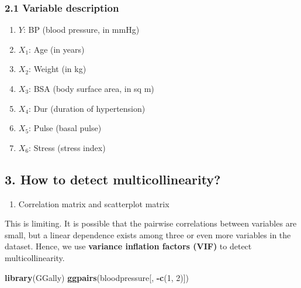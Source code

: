 \documentclass[]{article}
\newenvironment{Shaded}{\begin{snugshade}}{\end{snugshade}}
\newcommand{\DecValTok}[1]{\textcolor[rgb]{0.00,0.00,0.81}{#1}}
\newcommand{\KeywordTok}[1]{\textcolor[rgb]{0.13,0.29,0.53}{\textbf{#1}}}
\newcommand{\NormalTok}[1]{#1}
\newcommand{\OperatorTok}[1]{\textcolor[rgb]{0.81,0.36,0.00}{\textbf{#1}}}
\providecommand{\tightlist}{%
  \setlength{\itemsep}{0pt}\setlength{\parskip}{0pt}}
\begin{document}
\hypertarget{variable-description}{%
\subsubsection{2.1 Variable description}\label{variable-description}}

\begin{enumerate}
\def\labelenumi{\arabic{enumi}.}
\item
  \(Y\): BP (blood pressure, in mmHg)
\item
  \(X_1\): Age (in years)
\item
  \(X_2\): Weight (in kg)
\item
  \(X_3\): BSA (body surface area, in sq m)
\item
  \(X_4\): Dur (duration of hypertension)
\item
  \(X_5\): Pulse (basal pulse)
\item
  \(X_6\): Stress (stress index)
\end{enumerate}

\hypertarget{how-to-detect-multicollinearity}{%
\subsection{3. How to detect
multicollinearity?}\label{how-to-detect-multicollinearity}}

\begin{enumerate}
\def\labelenumi{\arabic{enumi}.}
\tightlist
\item
  Correlation matrix and scatterplot matrix
\end{enumerate}

This is limiting. It is possible that the pairwise correlations between
variables are small, but a linear dependence exists among three or even
more variables in the dataset. Hence, we use \textbf{variance inflation
factors (VIF)} to detect multicollinearity.

\begin{Shaded}
\begin{Highlighting}[]
\KeywordTok{library}\NormalTok{(GGally)}
\KeywordTok{ggpairs}\NormalTok{(bloodpressure[, }\OperatorTok{-}\KeywordTok{c}\NormalTok{(}\DecValTok{1}\NormalTok{, }\DecValTok{2}\NormalTok{)])}
\end{Highlighting}
\end{Shaded}
\end{document}
